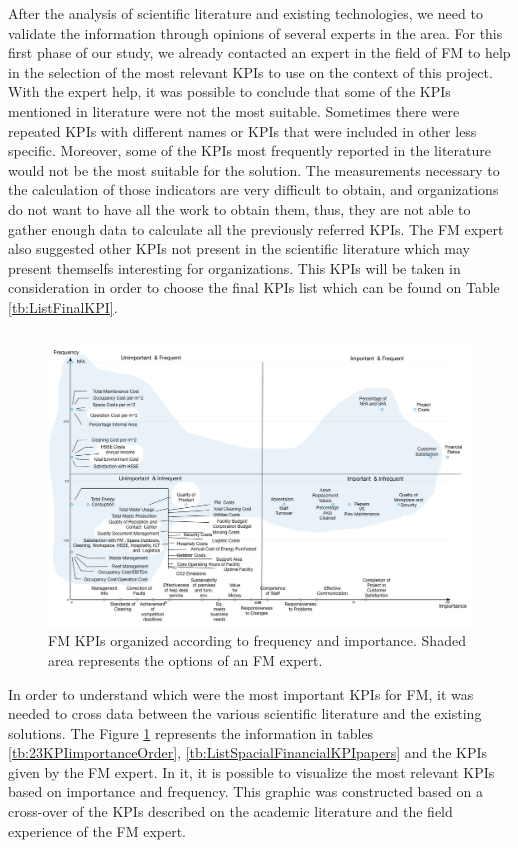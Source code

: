 After the analysis of scientific literature and existing technologies, we need to validate the information through opinions of several experts in the area. For this first phase of our study, we already contacted an expert in the field of FM to help in the selection of the most relevant KPIs to use on the context of this project. 
With the expert help, it was possible to conclude that some of the KPIs mentioned in literature were not the most suitable. Sometimes there were repeated KPIs with different names or KPIs that were included in other less specific. Moreover, some of the KPIs most frequently reported in the literature would not be the most suitable for the solution. The measurements necessary to the calculation of those indicators are very difficult to obtain, and organizations do not want to have all the work to obtain them, thus, they are not able to gather enough data to calculate all the previously referred KPIs. 
The FM expert also suggested other KPIs not present in the scientific literature which may present themselfs interesting for organizations. This KPIs will be taken in consideration in order to choose the final KPIs list which can be found on Table \ref{tb:ListFinalKPI}.
\begin{figure}[t!]
  \centering
  \includegraphics[width=1.1\textwidth]{img/importanceXfrequency10.jpg}
  \caption{FM KPIs organized according to frequency and importance. Shaded area represents the options of an FM expert.}
  \label{fig:importanceXfrequency}
\end{figure}
In order to understand which were the most important KPIs for FM, it was needed to cross data between the various scientific literature and the existing solutions.
The Figure \ref{fig:importanceXfrequency} represents the information in tables \ref{tb:23KPIimportanceOrder}, \ref{tb:ListSpacialFinancialKPIpapers} and the KPIs given by the FM expert. In it, it is possible to visualize the most relevant KPIs based on importance and frequency. This graphic was constructed based on a cross-over of the KPIs described on the academic literature and the field experience of the FM expert. 



